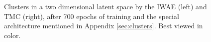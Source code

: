 \documentclass{article}
\begin{document}
\begin{appendices}
\begin{figure}[h!]
\begin{subfigure}[t]{0.5\textwidth}
    \end{subfigure}
    \caption{Clusters in a two dimensional latent space by the IWAE (left) and TMC (right), after 700 epochs of training and the special architecture mentioned in Appendix \ref{sec:clusters}. Best viewed in color. }
    \label{fig:clusters}
\end{figure}


\end{appendices}
\end{document}
